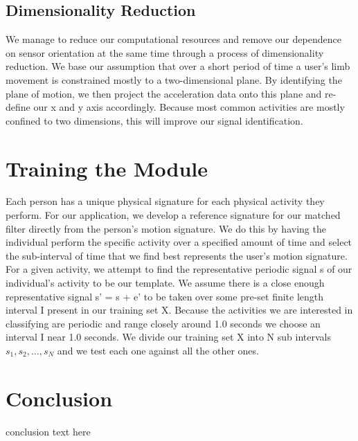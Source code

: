 \documentclass[journal]{IEEEtran}
\begin{document}
\subsection{Dimensionality Reduction}
We manage to reduce our computational resources and remove our dependence on sensor orientation at the 
same time through a process of dimensionality reduction. We base our assumption that over a short period 
of time a user’s limb movement is constrained mostly to a two-dimensional plane. 
By identifying the plane of motion, we then project the acceleration data onto this plane and re-define 
our x and y axis accordingly. Because most common activities are mostly confined to two dimensions, 
this will improve our signal identification.
\cite{bgk}
%
\section{Training the Module}
Each person has a unique physical signature for each physical activity they perform. 
For our application, we develop a reference signature for our matched filter directly from the 
person’s motion signature. We do this by having the individual perform the specific activity 
over a specified amount of time and select the sub-interval of time that we find best represents 
the user's motion signature. For a given activity, we attempt to find the representative periodic 
signal s of our individual’s activity to be our template. We assume there is a close enough 
representative signal s’ = s + e’ to be taken over some pre-set finite length interval I present 
in our training set X. Because the activities we are interested in classifying are periodic and 
range closely around 1.0 seconds we choose an interval I near 1.0 seconds. We divide our training 
set X into N sub intervals ${s_1, s_2, …, s_N}$ and we test each one against all the other ones.
%
\section{Conclusion}
conclusion text here
%
\appendices
%
\ifCLASSOPTIONcaptionsoff
  \newpage
\fi
%


\end{document}
